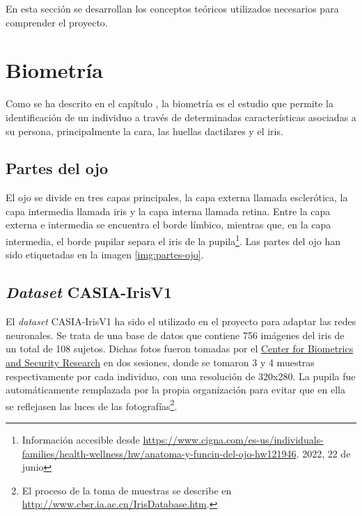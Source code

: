  \label{capitulo3}

En esta sección se desarrollan los conceptos teóricos utilizados necesarios para comprender el proyecto.

\section{Biometría}

Como se ha descrito en el capítulo , la biometría es el estudio que permite la identificación de un individuo a través de determinadas características asociadas a su persona, principalmente la cara, las huellas dactilares y el iris. 

\subsection{Partes del ojo} \label{partesojo} 

El ojo se divide en tres capas principales, la capa externa llamada esclerótica, la capa intermedia llamada iris y la capa interna llamada retina. Entre la capa externa e intermedia se encuentra el borde límbico, mientras que, en la capa intermedia, el borde pupilar separa el iris de la pupila\footnote{Información accesible desde \url{https://www.cigna.com/es-us/individuals-families/health-wellness/hw/anatoma-y-funcin-del-ojo-hw121946}. 2022, 22 de junio}.
Las partes del ojo han sido etiquetadas en la imagen \ref{img:partes-ojo}.


\subsection{\textit{Dataset} CASIA-IrisV1 }	\label{casia}

El \textit{dataset} CASIA-IrisV1 ha sido el utilizado en el proyecto para adaptar las redes neuronales. Se trata de una base de datos que contiene 756 imágenes del iris de un total de 108 sujetos. 
Dichas fotos fueron tomadas por el \href{http://www.cbsr.ia.ac.cn/english/index.asp}{Center for Biometrics and Security Research} en dos sesiones, donde se tomaron 3 y 4 muestras respectivamente por cada individuo, con una resolución de 320x280. 
La pupila fue automáticamente remplazada por la propia organización para evitar que en ella se reflejasen las luces de las fotografías\footnote{El proceso de la toma de muestras se describe en \url{http://www.cbsr.ia.ac.cn/IrisDatabase.htm}.}.

